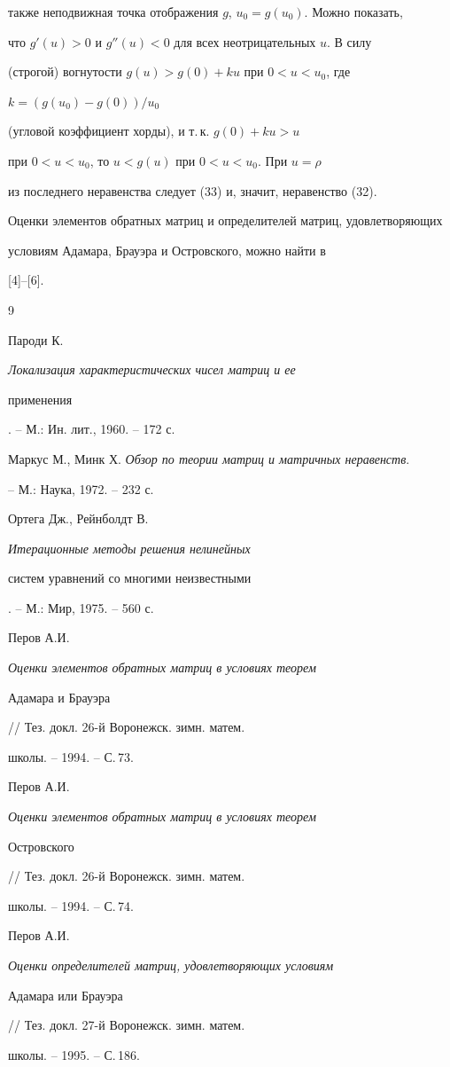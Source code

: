 также неподвижная точка отображения $g$, $u_0=g(u_0)$. Можно показать, 


что $g'(u)>0$ и $g''(u)<0$ для всех неотрицательных $u$. В силу 


(строгой) вогнутости $g(u)>g(0)+ku$ при $0<u<u_0$, где 


$k=(g(u_0)-g(0))/u_0$ 


(угловой коэффициент хорды), и т.\,к. $g(0)+ku>u$ 


при $0<u<u_0$, то $u<g(u)$ при $0<u<u_0$. При $u=\rho$ 


из последнего неравенства следует (33) и, значит, неравенство (32). 


 


Оценки элементов обратных матриц и определителей матриц, удовлетворяющих  


условиям Адамара, Брауэра и Островского, можно найти в 


[4]--[6]. 


 


\begin{thebibliography}{9} 


 




Пароди К. {\em Локализация характеристических чисел матриц и ее  


применения}. -- М.: Ин. лит., 1960. -- 172 с. 




Маркус М., Минк Х. {\em Обзор по теории матриц и матричных неравенств}. 


-- М.: Наука, 1972. -- 232 с. 




Ортега Дж., Рейнболдт В. {\em Итерационные методы решения нелинейных 


систем уравнений со многими неизвестными}. -- М.: Мир, 1975. -- 560 с. 




Перов А.И. {\em Оценки элементов обратных матриц в условиях теорем 


Адамара и Брауэра} // Тез. докл. 26-й Воронежск. зимн. матем. 


школы. -- 1994. -- С.\,73. 




Перов А.И. {\em Оценки элементов обратных матриц в условиях теорем 


Островского} // Тез. докл. 26-й Воронежск. зимн. матем. 


школы. -- 1994. -- С.\,74. 




Перов А.И. {\em Оценки определителей матриц, удовлетворяющих условиям 


Адамара или Брауэра} // Тез. докл. 27-й Воронежск. зимн. матем. 


школы. -- 1995. -- С.\,186. 


 


\end{thebibliography} 


